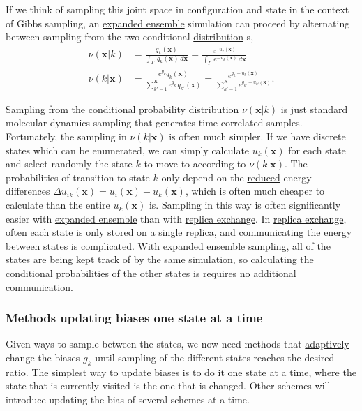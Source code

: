 \documentclass[9pt,review]{livecoms}
\newcommand{\vx}{\mathbf{x}}
\begin{document}
If we think of sampling this joint space in configuration and state in the context of Gibbs sampling, an \hyperlink{ref:ExpEns} {expanded ensemble} simulation can proceed by alternating between sampling from the two conditional \hyperlink{ref:Distribution} {distribution} s,
\begin{align}
\nu(\vx | k) &= \frac{q_k(\vx)}{\int_\Gamma  \, q_k(\vx) \, d\vx}  = \frac{e^{-u_k(\vx)}}{\int_\Gamma  \, e^{-u_k(\vx)} \, d\vx }  \\
\nu(k | \vx) &= \frac{e^{g_k}q_k(\vx)}{\sum\limits_{k'=1}^K e^{g_{k'}}q_{k'}(\vx)} = \frac{e^{g_k - u_k(\vx)}}{\sum\limits_{k'=1}^K e^{g_{k'} - u_{k'}(\vx)}}.
\label{equation:expanded-ensemble-gibbs-update}
\end{align}

Sampling from the conditional probability \hyperlink{ref:Distribution} {distribution}
$\nu(\vx | k)$ is just standard molecular dynamics sampling that generates time-correlated samples. Fortunately, the sampling in $\nu(k | \vx)$ is often much simpler.   If we have
discrete states which can be enumerated, we can simply calculate
$u_k(\vx)$ for each state and select randomly the state $k$ to move to according to $\nu(k|\vx)$.  The
probabilities of transition to state $k$ only depend on the \hyperlink{ref:reduced} {reduced} energy differences $\Delta
u_{ik}(\vx) = u_i(\vx) - u_k(\vx)$, which is often much cheaper to calculate
than the entire $u_k(\vx)$ is. Sampling in this way is often significantly easier with \hyperlink{ref:ExpEns} {expanded ensemble} than with \hyperlink{ref:ReplEx} {replica exchange}. In \hyperlink{ref:ReplEx} {replica exchange}, often each state is only stored on a single replica, and communicating the energy between states is complicated. With \hyperlink{ref:ExpEns} {expanded ensemble} sampling, all of the states are being kept track of by the same simulation, so calculating the conditional probabilities of the other states is requires no additional communication.

\subsubsection{\label{sec:singlestate} Methods updating biases one state at a time}
Given ways to sample between the states, we now need methods that \hyperlink{ref:Adaptive} {adaptively} change the biases $g_k$ until sampling of the different states reaches the desired ratio. The simplest way to update biases is to do it one state at a time, where the state that is currently visited is the one that is changed. Other schemes will introduce updating the bias of several schemes at a time.
\end{document}
